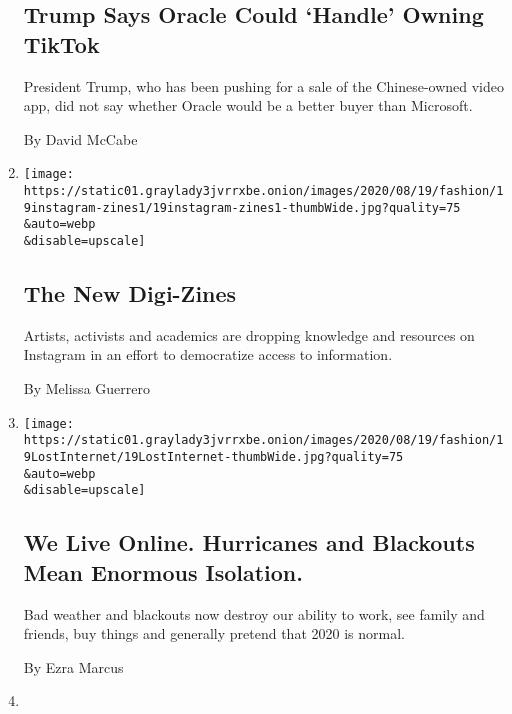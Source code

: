 \begin{enumerate}
  \hypertarget{trump-says-oracle-could-handle-owning-tiktok}{%
  \subsection{Trump Says Oracle Could `Handle' Owning
  TikTok}\label{trump-says-oracle-could-handle-owning-tiktok}}

  President Trump, who has been pushing for a sale of the Chinese-owned
  video app, did not say whether Oracle would be a better buyer than
  Microsoft.

  By David McCabe
\item
  \href{/2020/08/19/style/instagram-activism-graphics-zines.html}{}

  \texttt{[image: https://static01.graylady3jvrrxbe.onion/images/2020/08/19/fashion/19instagram-zines1/19instagram-zines1-thumbWide.jpg?quality=75\\\&auto=webp\\\&disable=upscale]}

  \hypertarget{the-new-digi-zines}{%
  \subsection{The New Digi-Zines}\label{the-new-digi-zines}}

  Artists, activists and academics are dropping knowledge and resources
  on Instagram in an effort to democratize access to information.

  By Melissa Guerrero
\item
  \href{/2020/08/19/style/coned-blackouts-spectrum-hurricanes.html}{}

  \texttt{[image: https://static01.graylady3jvrrxbe.onion/images/2020/08/19/fashion/19LostInternet/19LostInternet-thumbWide.jpg?quality=75\\\&auto=webp\\\&disable=upscale]}

  \hypertarget{we-live-online-hurricanes-and-blackouts-mean-enormous-isolation}{%
  \subsection{We Live Online. Hurricanes and Blackouts Mean Enormous
  Isolation.}\label{we-live-online-hurricanes-and-blackouts-mean-enormous-isolation}}

  Bad weather and blackouts now destroy our ability to work, see family
  and friends, buy things and generally pretend that 2020 is normal.

  By Ezra Marcus
\item
  \href{/2020/08/19/technology/apple-2-trillion.html}{}


\end{enumerate}

